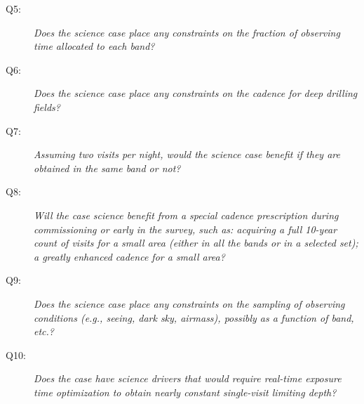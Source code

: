 \begin{description}

\item[Q5:] {\it Does the science case place any constraints on the
fraction of observing time allocated to each band?}


\item[Q6:] {\it Does the science case place any constraints on the
cadence for deep drilling fields?}


\item[Q7:] {\it Assuming two visits per night, would the science case
benefit if they are obtained in the same band or not?}


\item[Q8:] {\it Will the case science benefit from a special cadence
prescription during commissioning or early in the survey, such as:
acquiring a full 10-year count of visits for a small area (either in all
the bands or in a  selected set); a greatly enhanced cadence for a small
area?}


\item[Q9:] {\it Does the science case place any constraints on the
sampling of observing conditions (e.g., seeing, dark sky, airmass),
possibly as a function of band, etc.?}


\item[Q10:] {\it Does the case have science drivers that would require
real-time exposure time optimization to obtain nearly constant
single-visit limiting depth?}


\end{description}

\navigationbar

